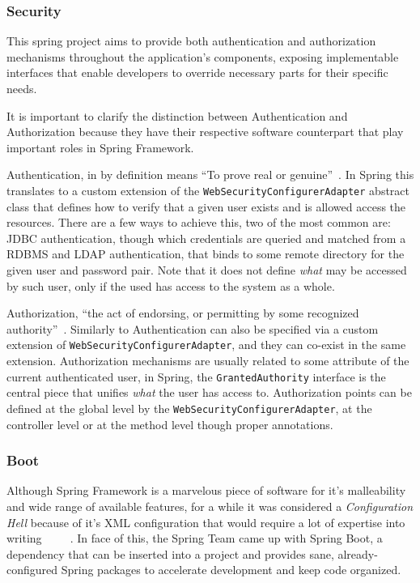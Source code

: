 \subsubsection{Security}
This spring project aims to provide both authentication and authorization mechanisms throughout the application's components, exposing implementable interfaces that enable developers to override necessary parts for their specific needs.

It is important to clarify the distinction between Authentication and Authorization because they have their respective software counterpart that play important roles in Spring Framework.

Authentication, in by definition means ``To prove real or genuine''~\cite{merriamwebster}. In Spring this translates to a custom extension of the \texttt{WebSecurityConfigurerAdapter} abstract class that defines how to verify that a given user exists and is allowed access the resources. There are a few ways to achieve this, two of the most common are: \gls{JDBC} authentication, though which credentials are queried and matched from a \gls{RDBMS} and \gls{LDAP} authentication, that binds to some remote directory for the given user and password pair. Note that it does not define \textit{what} may be accessed by such user, only if the used has access to the system as a whole.

Authorization, ``the act of endorsing, or permitting by some recognized authority''~\cite{merriamwebster}. Similarly to Authentication can also be specified via a custom extension of \texttt{WebSecurityConfigurerAdapter}, and they can co-exist in the same extension. Authorization mechanisms are usually related to some attribute of the current authenticated user, in Spring, the \texttt{GrantedAuthority} interface is the central piece that unifies \textit{what} the user has access to. Authorization points can be defined at the global level by the \texttt{WebSecurityConfigurerAdapter}, at the controller level or at the method level though proper annotations.

\subsubsection{Boot}
Although Spring Framework is a marvelous piece of software for it's malleability and wide range of available features, for a while it was considered a \textit{Configuration Hell} because of it's \gls{XML} configuration that would require a lot of expertise into writing~\cite{xmlhell1}~\cite{xmlhell2}~\cite{xmlhell3}~\cite{xmlhell4}~\cite{xmlhell5}. In face of this, the Spring Team came up with Spring Boot, a dependency that can be inserted into a project and provides sane, already-configured Spring packages to accelerate development and keep code organized.

